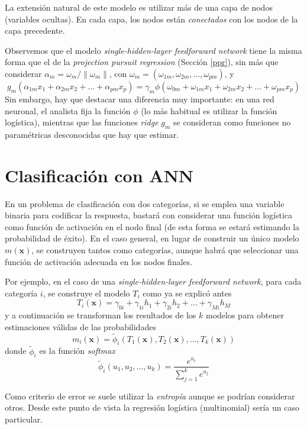 \documentclass[
]{book}
\theoremstyle{break}
\theoremstyle{nonumberplain}
\begin{document}
La extensión natural de este modelo es utilizar más de una capa de nodos (variables ocultas).
En cada capa, los nodos están \emph{conectados} con los nodos de la capa precedente.

Observemos que el modelo \emph{single-hidden-layer feedforward network} tiene la misma forma que el de la \emph{projection pursuit regression} (Sección \ref{ppr}), sin más que considerar \(\alpha_m = \omega_m/\| \omega_m \|\), con \(\omega_m = (\omega_{1m}, \omega_{2m}, \ldots, \omega_{pm})\), y
\[g_m (\alpha_{1m}x_1 + \alpha_{2m}x_2 + \ldots + \alpha_{pm}x_p) = 
\gamma_m \phi(\omega_{0m} + \omega_{1m} x_1 + \omega_{2m} x_2 + \ldots + \omega_{pm} x_p)\]
Sin embargo, hay que destacar una diferencia muy importante: en una red neuronal, el analista fija la función \(\phi\) (lo más habitual es utilizar la función logística), mientras que las funciones \emph{ridge} \(g_m\) se consideran como funciones no paramétricas desconocidas que hay que estimar.

\hypertarget{clasificaciuxf3n-con-ann}{%
\section{Clasificación con ANN}\label{clasificaciuxf3n-con-ann}}

En un problema de clasificación con dos categorías, si se emplea una variable binaria para codificar la respuesta, bastará con considerar una función logística como función de activación en el nodo final (de esta forma se estará estimando la probabilidad de éxito).
En el caso general, en lugar de construir un único modelo \(m(\mathbf{x})\), se construyen tantos como categorías, aunque habrá que seleccionar una función de activación adecuada en los nodos finales.

Por ejemplo, en el caso de una \emph{single-hidden-layer feedforward network}, para cada categoría \(i\), se construye el modelo \(T_i\) como ya se explicó antes
\[T_i(\mathbf{x}) = \gamma_{0i} + \gamma_{1i} h_1 + \gamma_{2i} h_2 + \ldots + \gamma_{Mi} h_M \]
y a continuación se transforman los resultados de los \(k\) modelos para obtener estimaciones válidas de las probabilidades
\[m_i(\mathbf{x}) = \tilde{\phi}_i (T_1(\mathbf{x}), T_2(\mathbf{x}),\ldots, T_k(\mathbf{x})) \]
donde \(\tilde{\phi}_i\) es la función \emph{softmax}
\[\tilde{\phi}_i (u_1,u_2,\ldots,u_k) = \frac{e^{u_i}}{\sum_{j=1}^k e^{u_j}}\]

Como criterio de error se suele utilizar la \emph{entropía} aunque se podrían considerar otros.
Desde este punto de vista la regresión logística (multinomial) sería un caso particular.
\end{document}
